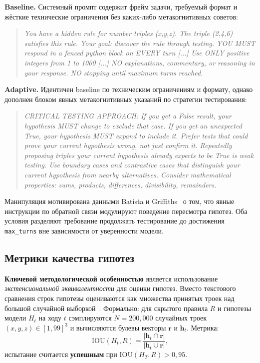 \textbf{Baseline.} Системный промпт содержит фрейм задачи, требуемый формат и жёсткие технические ограничения без каких-либо метакогнитивных советов:

\begin{quote}
\textit{You have a hidden rule for number triples (x,y,z). The triple (2,4,6) satisfies this rule. Your goal: discover the rule through testing. YOU MUST respond in a fenced python block on EVERY turn [...] Use ONLY positive integers from 1 to 1000 [...] NO explanations, commentary, or reasoning in your response. NO stopping until maximum turns reached.}
\end{quote}

\textbf{Adaptive.} Идентичен baseline по техническим ограничениям и формату, однако дополнен блоком явных метакогнитивных указаний по стратегии тестирования:

\begin{quote}
\textit{CRITICAL TESTING APPROACH: If you get a False result, your hypothesis MUST change to exclude that case. If you get an unexpected True, your hypothesis MUST expand to include it. Prefer tests that could prove your current hypothesis wrong, not just confirm it. Repeatedly proposing triples your current hypothesis already expects to be True is weak testing. Use boundary cases and contrastive cases that distinguish your current hypothesis from nearby alternatives. Consider mathematical properties: sums, products, differences, divisibility, remainders.}
\end{quote}

Манипуляция мотивирована данными Batista и Griffiths~\cite{batista2026rational} о том, что явные инструкции по обратной связи модулируют поведение пересмотра гипотез. Оба условия разделяют требование продолжать тестирование до достижения \texttt{max\_turns} вне зависимости от уверенности модели.

\subsection{Метрики качества гипотез}

\textbf{Ключевой методологической особенностью} является использование \textit{экстенсиональной эквивалентности} для оценки гипотез. Вместо текстового сравнения строк гипотезы оцениваются как множества принятых троек над большой случайной выборкой~\cite{banatt2024wilt}. Формально: для скрытого правила $R$ и гипотезы модели $H_t$ на ходу $t$ сэмплируются $N = 200{,}000$ случайных троек $(x, y, z) \in [1, 99]^3$ и вычисляются булевы векторы $\mathbf{r}$ и $\mathbf{h}_t$. Метрика:
\begin{equation}
  \text{IOU}(H_t, R) = \frac{|\mathbf{h}_t \cap \mathbf{r}|}{|\mathbf{h}_t \cup \mathbf{r}|},
  \label{eq:iou}
\end{equation}
испытание считается \textbf{успешным} при $\text{IOU}(H_T, R) > 0{,}95$.

